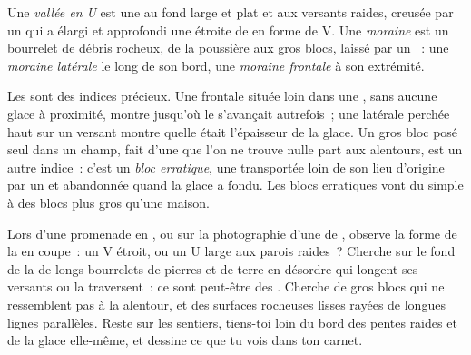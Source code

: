 \begin{definition}\label{def:g8:ice-on-earth:glacial-landforms}
Une \emph{vallée en U} est une  au fond large et plat et aux versants
raides, creusée par un  qui a élargi et approfondi une étroite
 de  en forme de V. Une \emph{moraine} est un bourrelet de
débris rocheux, de la poussière aux gros blocs, laissé par un ~:
une \emph{moraine latérale} le long de son bord, une
\emph{moraine frontale} à son extrémité.
\end{definition}

Les  sont des indices précieux. Une  frontale située loin
dans une , sans aucune glace à proximité, montre jusqu'où le 
s'avançait autrefois~; une  latérale perchée haut sur un versant
montre quelle était l'épaisseur de la glace. Un gros bloc posé seul dans
un champ, fait d'une  que l'on ne trouve nulle part aux alentours, est
un autre indice~: c'est un \emph{bloc erratique}, une  transportée
loin de son lieu d'origine par un  et abandonnée quand la glace a
fondu. Les blocs erratiques vont du simple  à des blocs plus gros
qu'une maison.

\begin{inthefield}
Lors d'une promenade en , ou sur la photographie d'une  de
, observe la forme de la  en coupe~: un V étroit, ou un U
large aux parois raides~? Cherche sur le fond de la  de longs
bourrelets de pierres et de terre en désordre qui longent ses versants ou
la traversent~: ce sont peut-être des . Cherche de gros blocs qui
ne ressemblent pas à la  alentour, et des surfaces rocheuses lisses
rayées de longues lignes parallèles. Reste sur les sentiers, tiens-toi
loin du bord des pentes raides et de la glace elle-même, et dessine ce que
tu vois dans ton carnet.
\end{inthefield}

